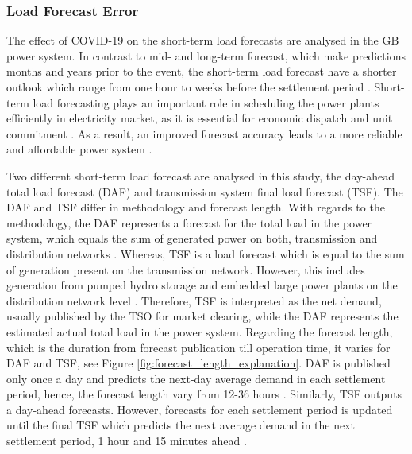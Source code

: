 \documentclass[energies,article,submit,moreauthors,pdftex]{Definitions/mdpi}
\begin{document}
\subsubsection{Load Forecast Error}\label{DemandForecastError}
The effect of COVID-19 on the short-term load forecasts are analysed in the GB power system. In contrast to mid- and long-term forecast, which make predictions months and years prior to the event, the short-term load forecast have a shorter outlook which range from one hour to weeks before the settlement period \cite{SahayDayNetwork,Khuntia2016ForecastingReview}. Short-term load forecasting plays an important role in scheduling the power plants efficiently in electricity market, as it is essential for economic dispatch and unit commitment \cite{He2020Day-aheadForest}. As a result, an improved forecast accuracy leads to a more reliable and affordable power system \cite{SahayDayNetwork}. 

Two different short-term load forecast are analysed in this study, the day-ahead total load forecast (DAF) and transmission system final load forecast (TSF). The DAF and TSF differ in methodology and forecast length. With regards to the methodology, the DAF represents a forecast for the total load in the power system, which equals the sum of generated power on both, transmission and distribution networks \cite{ENTSO-E2020ENTSO-EPlatform}. Whereas, TSF is a load forecast which is equal to the sum of generation present on the transmission network. However, this includes generation from pumped hydro storage and embedded large power plants on the distribution network level \cite{NationalGrid2020THE40}. Therefore, TSF is interpreted as the net demand, usually published by the TSO for market clearing, while the DAF represents the estimated actual total load in the power system.
Regarding the forecast length, which is the duration from forecast publication till operation time, it varies for DAF and TSF, see Figure \ref{fig:forecast_length_explanation}. DAF is published only once a day and predicts the next-day average demand in each settlement period, hence, the forecast length vary from 12-36 hours \cite{ENTSO-E2020ENTSO-EPlatform}. Similarly, TSF outputs a day-ahead forecasts. However, forecasts for each settlement period is updated until the final TSF which predicts the next average demand in the next settlement period, 1 hour and 15 minutes ahead \cite{ELEXON2020ELEXONBMRS}.
\end{document}
